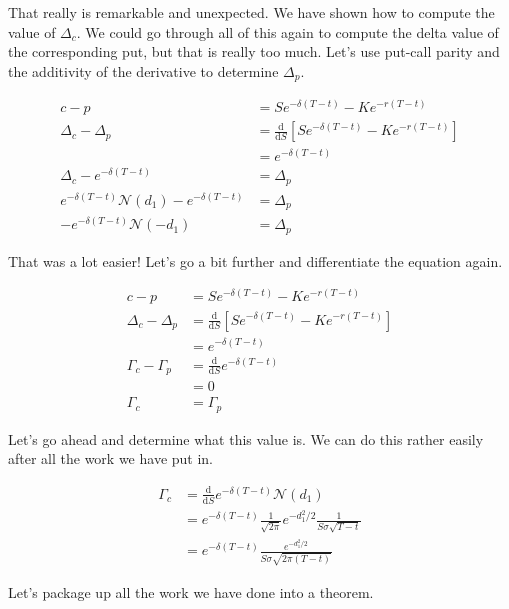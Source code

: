 \documentclass{ximera}
\begin{document}
That really is remarkable and unexpected. We have shown how to compute the value of $\Delta_c$. We could go through all of this again to compute the delta value of the corresponding put, but that is really too much. Let's use put-call parity and the additivity of the derivative to determine $\Delta_p$.

\begin{align*}
c-p 								&=Se^{-\delta (T-t)}-Ke^{-r(T-t)}\\
\Delta_c-\Delta_p 						&=\frac{\mathrm{d}}{\mathrm{d}S}\left[Se^{-\delta(T-t)}-Ke^{-r(T-t)}\right]\\
								&=e^{-\delta(T-t)}\\
\Delta_c-e^{-\delta(T-t)}					&=\Delta_p\\
e^{-\delta(T-t)}\mathcal{N}(d_1)-e^{-\delta(T-t)}	&=\Delta_p\\
-e^{-\delta(T-t)}\mathcal{N}(-d_1) 			&=\Delta_p
\end{align*}

That was a lot easier! Let's go a bit further and differentiate the equation again.

\begin{align*}
c-p 								&=Se^{-\delta (T-t)}-Ke^{-r(T-t)}\\
\Delta_c-\Delta_p 						&=\frac{\mathrm{d}}{\mathrm{d}S}\left[Se^{-\delta(T-t)}-Ke^{-r(T-t)}\right]\\
								&=e^{-\delta(T-t)}\\
\Gamma_c-\Gamma_p 					&=\frac{\mathrm{d}}{\mathrm{d}S}e^{-\delta(T-t)}\\
								&=0\\
\Gamma_c 							&=\Gamma_p
\end{align*}

Let's go ahead and determine what this value is. We can do this rather easily after all the work we have put in.

\begin{align*}
\Gamma_c 			&=\frac{\mathrm{d}}{\mathrm{d}S}e^{-\delta(T-t)}\mathcal{N}(d_1)\\
				&=e^{-\delta(T-t)}\frac{1}{\sqrt{2\pi}}e^{-d_1^2/2}\frac{1}{S\sigma\sqrt{T-t}}\\
				&=e^{-\delta(T-t)}\frac{e^{-d_1^2/2}}{S\sigma\sqrt{2\pi(T-t)}}
\end{align*}

Let's package up all the work we have done into a theorem.
\end{document}
